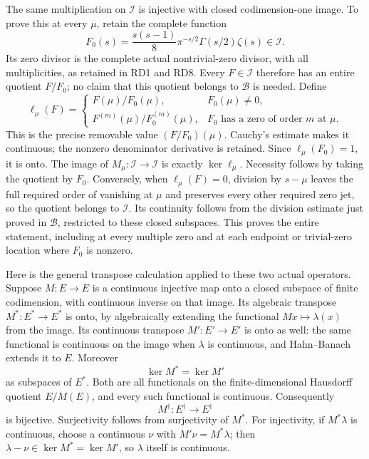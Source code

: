 The same multiplication on \(\mathcal I\) is injective with closed
codimension-one image. To prove this at every \(\mu\), retain the
complete function \[
F_0(s)=\frac{s(s-1)}8\pi^{-s/2}\Gamma(s/2)\zeta(s)\in\mathcal I.
\tag{VSD13.3}
\] Its zero divisor is the complete actual nontrivial-zero divisor, with
all multiplicities, as retained in RD1 and RD8. Every \(F\in\mathcal I\)
therefore has an entire quotient \(F/F_0\); no claim that this quotient
belongs to \(\mathcal B\) is needed. Define \[
\ell_\mu(F)=
\begin{cases}
F(\mu)/F_0(\mu),&F_0(\mu)\ne0,\\
F^{(m)}(\mu)/F_0^{(m)}(\mu),&
F_0\text{ has a zero of order }m\text{ at }\mu .
\end{cases}
\tag{VSD13.4}
\] This is the precise removable value \((F/F_0)(\mu)\). Cauchy's
estimate makes it continuous; the nonzero denominator derivative is
retained. Since \(\ell_\mu(F_0)=1\), it is onto. The image of
\(M_\mu:\mathcal I\to\mathcal I\) is exactly \(\ker\ell_\mu\). Necessity
follows by taking the quotient by \(F_0\). Conversely, when
\(\ell_\mu(F)=0\), division by \(s-\mu\) leaves the full required order
of vanishing at \(\mu\) and preserves every other required zero jet, so
the quotient belongs to \(\mathcal I\). Its continuity follows from the
division estimate just proved in \(\mathcal B\), restricted to these
closed subspaces. This proves the entire statement, including at every
multiple zero and at each endpoint or trivial-zero location where
\(F_0\) is nonzero.

Here is the general transpose calculation applied to these two actual
operators. Suppose \(M:E\to E\) is a continuous injective map onto a
closed subspace of finite codimension, with continuous inverse on that
image. Its algebraic transpose \(M^*:E^*\to E^*\) is onto, by
algebraically extending the functional \(Mx\mapsto\lambda(x)\) from the
image. Its continuous transpose \(M':E'\to E'\) is onto as well: the
same functional is continuous on the image when \(\lambda\) is
continuous, and Hahn--Banach extends it to \(E\). Moreover \[
\ker M^*=\ker M'
\tag{VSD13.5}
\] as subspaces of \(E^*\). Both are all functionals on the
finite-dimensional Hausdorff quotient \(E/M(E)\), and every such
functional is continuous. Consequently \[
M^\dagger:E^\dagger\longrightarrow E^\dagger
\tag{VSD13.6}
\] is bijective. Surjectivity follows from surjectivity of \(M^*\). For
injectivity, if \(M^*\lambda\) is continuous, choose a continuous
\(\nu\) with \(M'\nu=M^*\lambda\); then
\(\lambda-\nu\in\ker M^*=\ker M'\), so \(\lambda\) itself is continuous.

